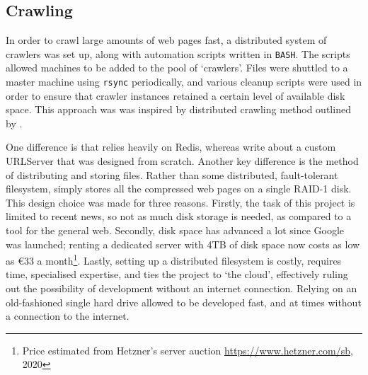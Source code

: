 \subsection{Crawling\label{crawling}}
In order to crawl large amounts of web pages fast, a
distributed system of crawlers was set up, along with
automation scripts written in {\tt BASH}. The scripts allowed
machines to be added to the pool of `crawlers'.  Files were shuttled
to a master machine using {\tt rsync} periodically, and various
cleanup scripts were used in order to ensure that crawler
instances retained a certain level of available disk space.  This
approach was was inspired by distributed crawling method outlined by
.

One difference is that
\nr{} relies heavily on Redis, whereas \citeauthor{page1998} write
about a custom URLServer that was designed from scratch.
Another key difference is
the method of distributing and storing files.  Rather than some
distributed, fault-tolerant filesystem, \nr{} simply stores all the
compressed web pages on a single RAID-1 disk.  This design
choice was made for three reasons.  Firstly, the task of this
project is limited to recent news, so not as much disk storage is
needed, as compared to a tool for the general web.  Secondly,
disk space has advanced a lot since Google was launched;
renting a dedicated server with 4TB of disk space now costs
as low as €33 a month\footnote{Price estimated from Hetzner's server auction \url{https://www.hetzner.com/sb}, 2020}.  Lastly, setting up a distributed filesystem
is costly, requires time, specialised expertise, and ties the
project to `the cloud', effectively ruling out the possibility of
development without an internet connection.
Relying on an
old-fashioned single hard drive allowed \nr{} to be developed fast,
and at times without a connection to the internet.